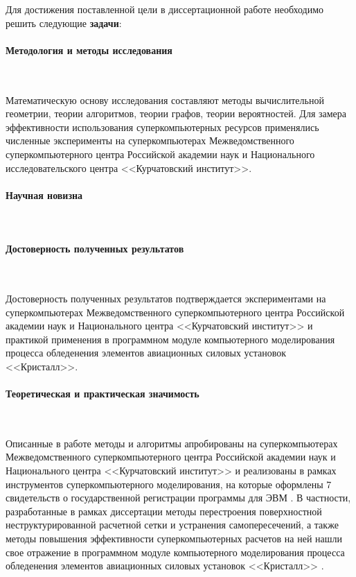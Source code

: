 

Для достижения поставленной цели в диссертационной работе необходимо решить следующие \textbf{задачи}:
\begin{enumerate}

\end{enumerate}

\paragraph{Методология и методы исследования} \

Математическую основу исследования составляют методы вычислительной геометрии, теории алгоритмов, теории графов, теории вероятностей.
Для замера эффективности использования суперкомпьютерных ресурсов применялись численные эксперименты на суперкомпьютерах Межведомственного суперкомпьютерного центра Российской академии наук и Национального исследовательского центра <<Курчатовский институт>>.

\paragraph{Научная новизна} \
\begin{itemize}

\end{itemize}

\paragraph{Достоверность полученных результатов} \

Достоверность полученных результатов подтверждается экспериментами на суперкомпьютерах Межведомственного суперкомпьютерного центра Российской академии наук и Национального центра <<Курчатовский институт>> и практикой применения в программном модуле компьютерного моделирования процесса обледенения элементов авиационных силовых установок <<Кристалл>>.

\paragraph{Теоретическая и практическая значимость} \



Описанные в работе методы и алгоритмы апробированы на суперкомпьютерах Межведомственного суперкомпьютерного центра Российской академии наук и Национального центра <<Курчатовский институт>> и реализованы в рамках инструментов суперкомпьютерного моделирования, на которые оформлены 7 свидетельств о государственной регистрации программы для ЭВМ \cite{CertGoryachev2023Crys,CertGoryachev2020Crys,CertRybakov2021PrepUnstruct,CertRybakov2020PrepStruct,CertRybakov2024Surf,CertRybakov2023Mon,CertRybakov2019AVX}.
В частности, разработанные в рамках диссертации методы перестроения поверхностной неструктурированной расчетной сетки и устранения самопересечений, а также методы повышения эффективности суперкомпьютерных расчетов на ней нашли свое отражение в программном модуле компьютерного моделирования процесса обледенения элементов авиационных силовых установок <<Кристалл>> \cite{CertGoryachev2023Crys,CertGoryachev2020Crys}.

